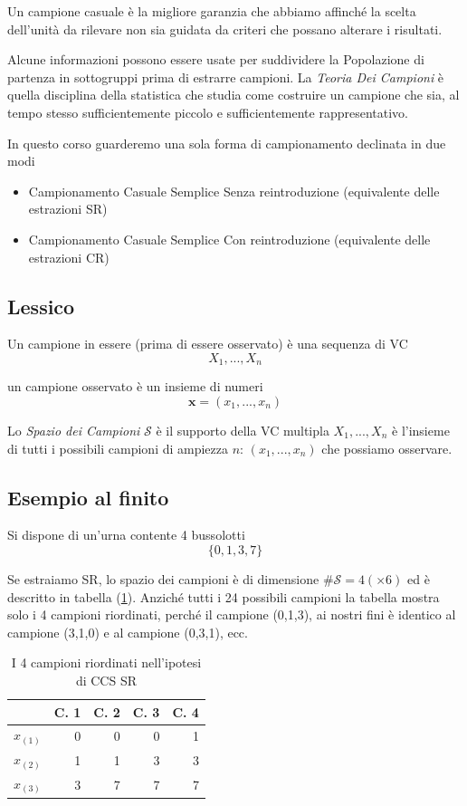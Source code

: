 \documentclass[
  11pt,
]{book}
\providecommand{\tightlist}{%
  \setlength{\itemsep}{0pt}\setlength{\parskip}{0pt}}
\theoremstyle{mytheoremstyle}
\theoremstyle{mydefstyle}
\begin{document}
Un campione casuale è la migliore garanzia che abbiamo affinché la scelta dell'unità da rilevare non sia guidata da criteri che possano alterare i risultati.

Alcune informazioni possono essere usate per suddividere la Popolazione di partenza in sottogruppi prima di estrarre campioni. La \emph{Teoria Dei Campioni} è quella disciplina della statistica che studia come costruire un campione che sia, al tempo stesso sufficientemente piccolo e sufficientemente rappresentativo.

In questo corso guarderemo una sola forma di campionamento declinata in due modi

\begin{itemize}
\tightlist
\item
  Campionamento Casuale Semplice Senza reintroduzione (equivalente delle estrazioni SR)
\item
  Campionamento Casuale Semplice Con reintroduzione (equivalente delle estrazioni CR)
\end{itemize}

\subsection{Lessico}\label{lessico}

Un campione in essere (prima di essere osservato) è una sequenza di VC
\[X_1,...,X_n\]

un campione osservato è un insieme di numeri
\[\mathbf{x}=(x_1,...,x_n)\]

Lo \emph{Spazio dei Campioni} \(\mathcal{S}\) è il supporto della VC multipla \(X_1,...,X_n\)
è l'insieme di tutti i possibili campioni di ampiezza \(n\): \((x_1,...,x_n)\) che possiamo osservare.

\subsection{Esempio al finito}\label{esempio-al-finito}

Si dispone di un'urna contente 4 bussolotti
\[\{0,1,3,7\}\]

Se estraiamo SR, lo spazio dei campioni è di dimensione \(\#\mathcal{S}=4(\times 6)\) ed è descritto in tabella (\ref{tab:csr}).
Anziché tutti i 24 possibili campioni la tabella mostra solo i 4 campioni riordinati, perché il campione (0,1,3), ai nostri fini
è identico al campione (3,1,0) e al campione (0,3,1), ecc.

\begin{table}

\caption{\label{tab:csr}I 4 campioni riordinati nell'ipotesi di CCS SR}
\centering
\begin{tabular}[t]{>{}l|>{}r|>{}r|>{}r|r}
\toprule
  & C. 1 & C. 2 & C. 3 & C. 4\\
\midrule
$x_{(1)}$ & 0 & 0 & 0 & 1\\
$x_{(2)}$ & 1 & 1 & 3 & 3\\
$x_{(3)}$ & 3 & 7 & 7 & 7\\
\bottomrule
\end{tabular}
\end{table}
\end{document}
